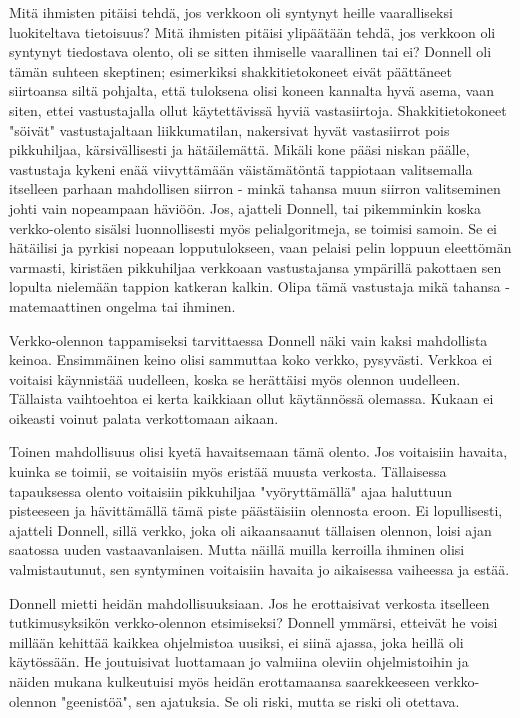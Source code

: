 Mitä ihmisten pitäisi tehdä, jos verkkoon oli syntynyt heille vaaralliseksi luokiteltava tietoisuus? Mitä ihmisten pitäisi ylipäätään tehdä, jos verkkoon oli syntynyt tiedostava olento, oli se sitten ihmiselle vaarallinen tai ei? Donnell oli tämän suhteen skeptinen; esimerkiksi shakkitietokoneet eivät päättäneet siirtoansa siltä pohjalta, että tuloksena olisi koneen kannalta hyvä asema, vaan siten, ettei vastustajalla ollut käytettävissä hyviä vastasiirtoja. Shakkitietokoneet "söivät" vastustajaltaan liikkumatilan, nakersivat hyvät vastasiirrot pois pikkuhiljaa, kärsivällisesti ja hätäilemättä. Mikäli kone pääsi niskan päälle, vastustaja kykeni enää viivyttämään väistämätöntä tappiotaan valitsemalla itselleen parhaan mahdollisen siirron - minkä tahansa muun siirron valitseminen johti vain nopeampaan häviöön. Jos, ajatteli Donnell, tai pikemminkin koska verkko-olento sisälsi luonnollisesti myös pelialgoritmeja, se toimisi samoin. Se ei hätäilisi ja pyrkisi nopeaan lopputulokseen, vaan pelaisi pelin loppuun eleettömän varmasti, kiristäen pikkuhiljaa verkkoaan vastustajansa ympärillä pakottaen sen lopulta nielemään tappion katkeran kalkin. Olipa tämä vastustaja mikä tahansa - matemaattinen ongelma tai ihminen.


Verkko-olennon tappamiseksi tarvittaessa Donnell näki vain kaksi mahdollista keinoa. Ensimmäinen keino olisi sammuttaa koko verkko, pysyvästi. Verkkoa ei voitaisi käynnistää uudelleen, koska se herättäisi myös olennon uudelleen. Tällaista vaihtoehtoa ei kerta kaikkiaan ollut käytännössä olemassa. Kukaan ei oikeasti voinut palata verkottomaan aikaan.


Toinen mahdollisuus olisi kyetä havaitsemaan tämä olento. Jos voitaisiin havaita, kuinka se toimii, se voitaisiin myös eristää muusta verkosta. Tällaisessa tapauksessa olento voitaisiin pikkuhiljaa "vyöryttämällä" ajaa haluttuun pisteeseen ja hävittämällä tämä piste päästäisiin olennosta eroon. Ei lopullisesti, ajatteli Donnell, sillä verkko, joka oli aikaansaanut tällaisen olennon, loisi ajan saatossa uuden vastaavanlaisen. Mutta näillä muilla kerroilla ihminen olisi valmistautunut, sen syntyminen voitaisiin havaita jo aikaisessa vaiheessa ja estää.


Donnell mietti heidän mahdollisuuksiaan. Jos he erottaisivat verkosta itselleen tutkimusyksikön verkko-olennon etsimiseksi? Donnell ymmärsi, etteivät he voisi millään kehittää kaikkea ohjelmistoa uusiksi, ei siinä ajassa, joka heillä oli käytössään. He joutuisivat luottamaan jo valmiina oleviin ohjelmistoihin ja näiden mukana kulkeutuisi myös heidän erottamaansa saarekkeeseen verkko-olennon "geenistöä", sen ajatuksia. Se oli riski, mutta se riski oli otettava.


